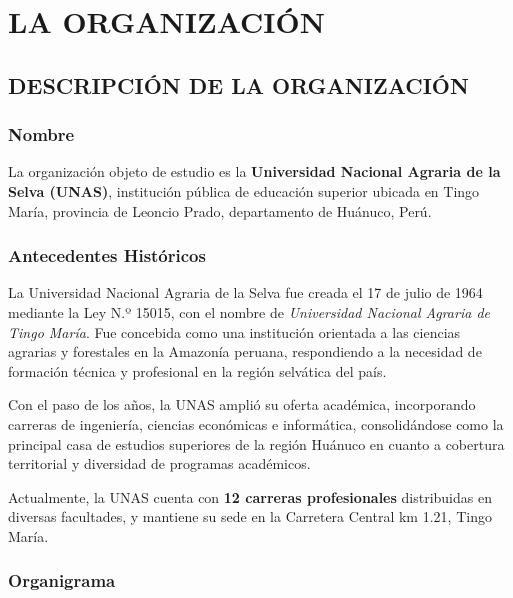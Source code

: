 \documentclass[12pt, a4paper]{report}
\begin{document}
\chapter{LA ORGANIZACIÓN}

\section{DESCRIPCIÓN DE LA ORGANIZACIÓN}

\subsection{Nombre}

La organización objeto de estudio es la \textbf{Universidad Nacional Agraria de la Selva (UNAS)}, institución pública de educación superior ubicada en Tingo María, provincia de Leoncio Prado, departamento de Huánuco, Perú.

\subsection{Antecedentes Históricos}

La Universidad Nacional Agraria de la Selva fue creada el 17 de julio de 1964 mediante la Ley N.º 15015, con el nombre de \textit{Universidad Nacional Agraria de Tingo María}. Fue concebida como una institución orientada a las ciencias agrarias y forestales en la Amazonía peruana, respondiendo a la necesidad de formación técnica y profesional en la región selvática del país.

Con el paso de los años, la UNAS amplió su oferta académica, incorporando carreras de ingeniería, ciencias económicas e informática, consolidándose como la principal casa de estudios superiores de la región Huánuco en cuanto a cobertura territorial y diversidad de programas académicos.

Actualmente, la UNAS cuenta con \textbf{12 carreras profesionales} distribuidas en diversas facultades, y mantiene su sede en la Carretera Central km 1.21, Tingo María.

\subsection{Organigrama}
\end{document}
